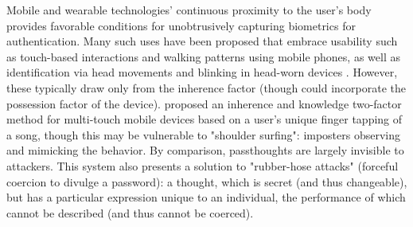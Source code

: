 \documentclass{sigchi}
\begin{document}
Mobile and wearable technologies' continuous proximity to the user's body provides favorable conditions for unobtrusively capturing biometrics for authentication. Many such uses have been proposed that embrace usability such as touch-based interactions \cite{Tartz2015, Holz2015} and walking patterns \cite{Lu2014} using mobile phones, as well as identification via head movements and blinking in head-worn devices \cite{Rogers2015}. However, these typically draw only from the inherence factor (though could incorporate the possession factor of the device). \cite{Chen2015} proposed an inherence and knowledge two-factor method for multi-touch mobile devices based on a user's unique finger tapping of a song, though this may be vulnerable to "shoulder surfing": imposters observing and mimicking the behavior. By comparison, passthoughts are largely invisible to attackers. This system also presents a solution to "rubber-hose attacks" (forceful coercion to divulge a password): a thought, which is secret (and thus changeable), but has a particular expression unique to an individual, the performance of which cannot be described (and thus cannot be coerced).




\end{document}
